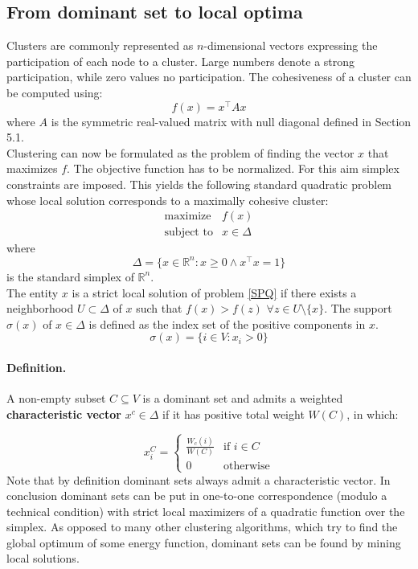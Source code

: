 \subsection{From dominant set to local optima}

Clusters are commonly represented as $n$-dimensional vectors expressing the participation of each node to a cluster. Large numbers denote a strong participation, while zero values no participation. The cohesiveness of a cluster can be computed using:
\begin{equation}
f(x)=x^\top Ax
\end{equation}
where $A$ is the symmetric real-valued matrix with null diagonal defined in Section 5.1.\\
Clustering can now be formulated as the problem of finding the vector $x$ that maximizes $f$. The objective function has to be normalized. For this aim simplex constraints are imposed. This yields the following standard quadratic problem whose local solution corresponds to a maximally cohesive cluster:
\begin{equation}\label{SPQ}
\begin{array}{lcl}
\text{maximize} & f(x) \\
\text{subject to} & x \in \Delta
\end{array}
\end{equation}
where
\begin{equation}
\Delta=\{x\in\mathbb{R}^n:x\geq 0 \land x^\top x = 1\}
\end{equation}
is the standard simplex of $\mathbb{R}^n$.\\

The entity $x$ is a strict local solution of problem \ref{SPQ} if there exists a neighborhood $U \subset	\Delta$ of $x$ such that $f(x) > f(z)$ $\forall z \in U\setminus\{x\}$. The support $\sigma(x)$ of $x\in\Delta$ is defined as the index set of the positive components in $x$.
$$\sigma(x) = \{i\in V: x_i > 0\}$$


\paragraph{Definition.} A non-empty subset $C \subseteq V$ is a dominant set and admits a weighted \textbf{characteristic vector} $x^c\in \Delta$ if it has positive total weight $W(C)$, in which:

$$
  x_i^C= \begin{cases}
	\frac{W_c(i)}{W(C)} & \text{if } i\in C\\
	0 & \text{otherwise}
\end{cases}
$$
Note that by definition dominant sets always admit a characteristic vector. In conclusion dominant sets can be put in one-to-one correspondence (modulo a technical condition) with strict local maximizers of a quadratic function over the simplex. As opposed to many other clustering algorithms, which try to find the global optimum of some energy function, dominant sets can be found by mining local solutions.



